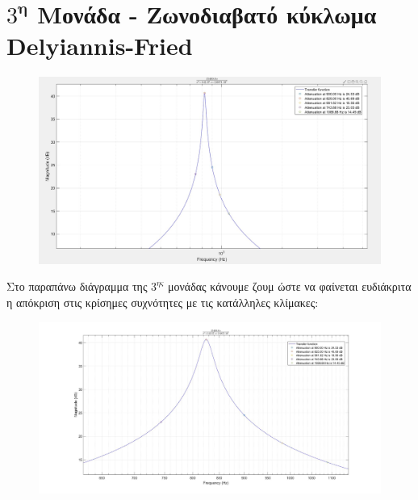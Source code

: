 \documentclass{article}
\begin{document}
{{\section*{$3^\textbf{η}$ Μονάδα - Ζωνοδιαβατό κύκλωμα Delyiannis-Fried} 
  \begin{figure}[h!]
\centering
 	\advance\leftskip-2cm
  \includegraphics[width=160mm,scale=2]{thema2/matlab2.jpg}
\end{figure}  
\normalsize{}
Στο παραπάνω διάγραμμα της $3^{ης}$ μονάδας κάνουμε ζουμ ώστε να φαίνεται ευδιάκριτα η απόκριση στις κρίσημες συχνότητες με τις κατάλληλες κλίμακες:
\large{}
  \begin{figure}[h!]
\centering
 	\advance\leftskip-1cm
  \includegraphics[width=120mm,scale=2]{thema2/z3.jpg}
\end{figure} 
\newpage
}}
\end{document}
